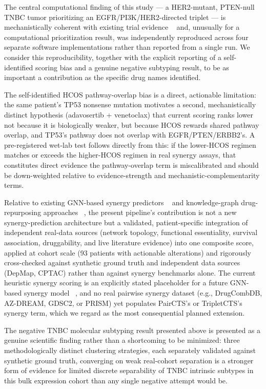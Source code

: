 \documentclass[10pt,letterpaper]{article}
\begin{document}
The central computational finding of this study --- a HER2-mutant, PTEN-null TNBC tumor prioritizing an EGFR/PI3K/HER2-directed triplet --- is mechanistically coherent with existing trial evidence ~\cite{bib8} and, unusually for a computational prioritization result, was independently reproduced across four separate software implementations rather than reported from a single run. We consider this reproducibility, together with the explicit reporting of a self-identified scoring bias and a genuine negative subtyping result, to be as important a contribution as the specific drug names identified.

The self-identified HCOS pathway-overlap bias is a direct, actionable limitation: the same patient's TP53 nonsense mutation motivates a second, mechanistically distinct hypothesis (adavosertib + venetoclax) that current scoring ranks lower not because it is biologically weaker, but because HCOS rewards shared pathway overlap, and TP53's pathway does not overlap with EGFR/PTEN/ERBB2's. A pre-registered wet-lab test follows directly from this: if the lower-HCOS regimen matches or exceeds the higher-HCOS regimen in real synergy assays, that constitutes direct evidence the pathway-overlap term is miscalibrated and should be down-weighted relative to evidence-strength and mechanistic-complementarity terms.

Relative to existing GNN-based synergy predictors ~\cite{bib3,bib4,bib5} and knowledge-graph drug-repurposing approaches ~\cite{bib6,bib7}, the present pipeline's contribution is not a new synergy-prediction architecture but a validated, patient-specific integration of independent real-data sources (network topology, functional essentiality, survival association, druggability, and live literature evidence) into one composite score, applied at cohort scale (93 patients with actionable alterations) and rigorously cross-checked against synthetic ground truth and independent data sources (DepMap, CPTAC) rather than against synergy benchmarks alone. The current heuristic synergy scoring is an explicitly stated placeholder for a future GNN-based synergy model ~\cite{bib3,bib4}, and no real pairwise synergy dataset (e.g., DrugCombDB, AZ-DREAM, GDSC2, or PRISM) yet populates PairCTS's or TripletCTS's synergy term, which we regard as the most consequential planned extension.

The negative TNBC molecular subtyping result presented above is presented as a genuine scientific finding rather than a shortcoming to be minimized: three methodologically distinct clustering strategies, each separately validated against synthetic ground truth, converging on weak real-cohort separation is a stronger form of evidence for limited discrete separability of TNBC intrinsic subtypes in this bulk expression cohort than any single negative attempt would be.
\end{document}
